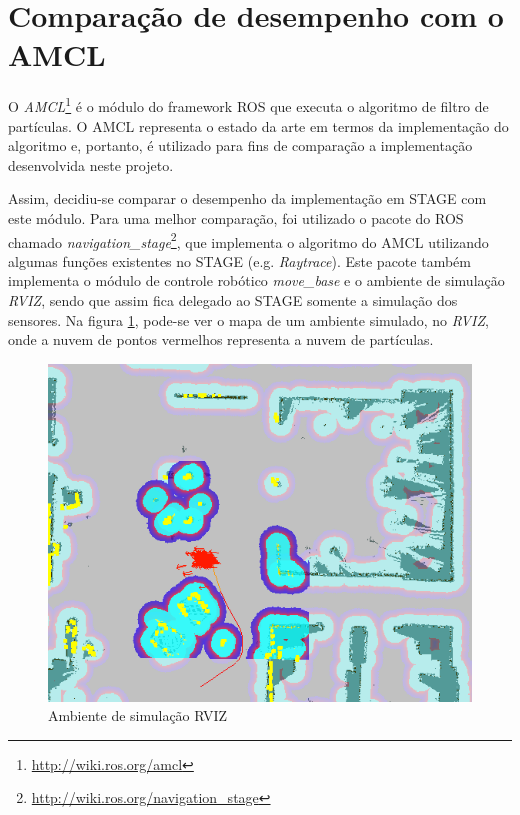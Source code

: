 \documentclass[
	12pt,				%
	openright,			%
	oneside,			%
	a4paper,			%
	english,			%
	french,				%
	spanish,			%
	brazil,				%
	]{abntex2}
\begin{document}
\section{Comparação de desempenho com o AMCL}
\label{sec:amcl}

O \emph{AMCL}\footnote{\url{http://wiki.ros.org/amcl}} é o módulo do framework ROS \cite{ros-book} que executa o algoritmo de filtro de partículas. O AMCL representa o estado da arte em termos da implementação do algoritmo e, portanto, é utilizado para fins de comparação a implementação desenvolvida neste projeto.\par

Assim, decidiu-se comparar o desempenho da implementação em STAGE com este módulo. Para uma melhor comparação, foi utilizado o pacote do ROS chamado \emph{navigation\_stage}\footnote{\url{http://wiki.ros.org/navigation_stage}}, que implementa o algoritmo do AMCL utilizando algumas funções existentes no STAGE (e.g. \emph{Raytrace}). Este pacote também implementa o módulo de controle robótico \emph{move\_base} e o ambiente de simulação \emph{RVIZ}, sendo que assim fica delegado ao STAGE somente a simulação dos sensores. Na figura \ref{fig:rviz_environ}, pode-se ver o mapa de um ambiente simulado, no \emph{RVIZ}, onde a nuvem de pontos vermelhos representa a nuvem de partículas.\par

\begin{figure}[h!]
    \centering
    \includegraphics[scale=0.4]{figs/rviz_environ}
    \caption{Ambiente de simulação RVIZ}
    \label{fig:rviz_environ}
\end{figure}
\end{document}
